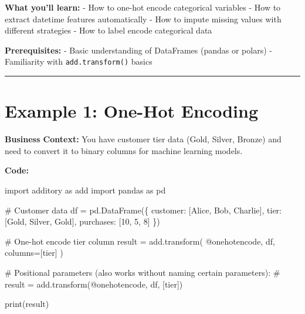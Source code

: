 \documentclass[
  letterpaper,
]{scrbook}
\newenvironment{Shaded}{\begin{snugshade}}{\end{snugshade}}
\newcommand{\BuiltInTok}[1]{\textcolor[rgb]{0.00,0.23,0.31}{#1}}
\newcommand{\CommentTok}[1]{\textcolor[rgb]{0.37,0.37,0.37}{#1}}
\newcommand{\DecValTok}[1]{\textcolor[rgb]{0.68,0.00,0.00}{#1}}
\newcommand{\ImportTok}[1]{\textcolor[rgb]{0.00,0.46,0.62}{#1}}
\newcommand{\NormalTok}[1]{\textcolor[rgb]{0.00,0.23,0.31}{#1}}
\newcommand{\OperatorTok}[1]{\textcolor[rgb]{0.37,0.37,0.37}{#1}}
\newcommand{\StringTok}[1]{\textcolor[rgb]{0.13,0.47,0.30}{#1}}
\begin{document}
\textbf{What you'll learn:} - How to one-hot encode categorical
variables - How to extract datetime features automatically - How to
impute missing values with different strategies - How to label encode
categorical data

\textbf{Prerequisites:} - Basic understanding of DataFrames (pandas or
polars) - Familiarity with \texttt{add.transform()} basics

\begin{center}\rule{0.5\linewidth}{0.5pt}\end{center}

\section{Example 1: One-Hot Encoding}\label{example-1-one-hot-encoding}

\textbf{Business Context:} You have customer tier data (Gold, Silver,
Bronze) and need to convert it to binary columns for machine learning
models.

\textbf{Code:}

\begin{Shaded}
\begin{Highlighting}[]
\ImportTok{import}\NormalTok{ additory }\ImportTok{as}\NormalTok{ add}
\ImportTok{import}\NormalTok{ pandas }\ImportTok{as}\NormalTok{ pd}

\CommentTok{\# Customer data}
\NormalTok{df }\OperatorTok{=}\NormalTok{ pd.DataFrame(\{}
    \StringTok{\textquotesingle{}customer\textquotesingle{}}\NormalTok{: [}\StringTok{\textquotesingle{}Alice\textquotesingle{}}\NormalTok{, }\StringTok{\textquotesingle{}Bob\textquotesingle{}}\NormalTok{, }\StringTok{\textquotesingle{}Charlie\textquotesingle{}}\NormalTok{],}
    \StringTok{\textquotesingle{}tier\textquotesingle{}}\NormalTok{: [}\StringTok{\textquotesingle{}Gold\textquotesingle{}}\NormalTok{, }\StringTok{\textquotesingle{}Silver\textquotesingle{}}\NormalTok{, }\StringTok{\textquotesingle{}Gold\textquotesingle{}}\NormalTok{],}
    \StringTok{\textquotesingle{}purchases\textquotesingle{}}\NormalTok{: [}\DecValTok{10}\NormalTok{, }\DecValTok{5}\NormalTok{, }\DecValTok{8}\NormalTok{]}
\NormalTok{\})}

\CommentTok{\# One{-}hot encode tier column}
\NormalTok{result }\OperatorTok{=}\NormalTok{ add.transform(}
    \StringTok{\textquotesingle{}@onehotencode\textquotesingle{}}\NormalTok{,}
\NormalTok{    df,}
\NormalTok{    columns}\OperatorTok{=}\NormalTok{[}\StringTok{\textquotesingle{}tier\textquotesingle{}}\NormalTok{]}
\NormalTok{)}

\CommentTok{\# Positional parameters (also works without naming certain parameters):}
\CommentTok{\# result = add.transform(\textquotesingle{}@onehotencode\textquotesingle{}, df, [\textquotesingle{}tier\textquotesingle{}])}

\BuiltInTok{print}\NormalTok{(result)}
\end{Highlighting}
\end{Shaded}
\end{document}
